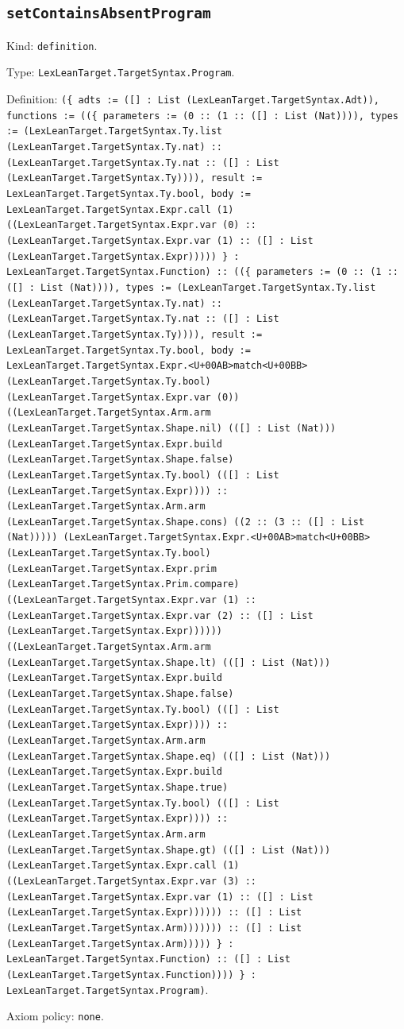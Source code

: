 \documentclass[11pt]{article}
\begin{document}
\subsection*{\texttt{setContainsAbsentProgram}}
\noindent Kind: \texttt{definition}.\par
\noindent Type: \texttt{LexLeanTarget.TargetSyntax.Program}.\par
\noindent Definition: \texttt{(\{ adts := ([] : List (LexLeanTarget.TargetSyntax.Adt)), functions := ((\{ parameters := (0 :: (1 :: ([] : List (Nat)))), types := (LexLeanTarget.TargetSyntax.Ty.list (LexLeanTarget.TargetSyntax.Ty.nat) :: (LexLeanTarget.TargetSyntax.Ty.nat :: ([] : List (LexLeanTarget.TargetSyntax.Ty)))), result := LexLeanTarget.TargetSyntax.Ty.bool, body := LexLeanTarget.TargetSyntax.Expr.call (1) ((LexLeanTarget.TargetSyntax.Expr.var (0) :: (LexLeanTarget.TargetSyntax.Expr.var (1) :: ([] : List (LexLeanTarget.TargetSyntax.Expr))))) \} : LexLeanTarget.TargetSyntax.Function) :: ((\{ parameters := (0 :: (1 :: ([] : List (Nat)))), types := (LexLeanTarget.TargetSyntax.Ty.list (LexLeanTarget.TargetSyntax.Ty.nat) :: (LexLeanTarget.TargetSyntax.Ty.nat :: ([] : List (LexLeanTarget.TargetSyntax.Ty)))), result := LexLeanTarget.TargetSyntax.Ty.bool, body := LexLeanTarget.TargetSyntax.Expr.<U+00AB>match<U+00BB> (LexLeanTarget.TargetSyntax.Ty.bool) (LexLeanTarget.TargetSyntax.Expr.var (0)) ((LexLeanTarget.TargetSyntax.Arm.arm (LexLeanTarget.TargetSyntax.Shape.nil) (([] : List (Nat))) (LexLeanTarget.TargetSyntax.Expr.build (LexLeanTarget.TargetSyntax.Shape.false) (LexLeanTarget.TargetSyntax.Ty.bool) (([] : List (LexLeanTarget.TargetSyntax.Expr)))) :: (LexLeanTarget.TargetSyntax.Arm.arm (LexLeanTarget.TargetSyntax.Shape.cons) ((2 :: (3 :: ([] : List (Nat))))) (LexLeanTarget.TargetSyntax.Expr.<U+00AB>match<U+00BB> (LexLeanTarget.TargetSyntax.Ty.bool) (LexLeanTarget.TargetSyntax.Expr.prim (LexLeanTarget.TargetSyntax.Prim.compare) ((LexLeanTarget.TargetSyntax.Expr.var (1) :: (LexLeanTarget.TargetSyntax.Expr.var (2) :: ([] : List (LexLeanTarget.TargetSyntax.Expr)))))) ((LexLeanTarget.TargetSyntax.Arm.arm (LexLeanTarget.TargetSyntax.Shape.lt) (([] : List (Nat))) (LexLeanTarget.TargetSyntax.Expr.build (LexLeanTarget.TargetSyntax.Shape.false) (LexLeanTarget.TargetSyntax.Ty.bool) (([] : List (LexLeanTarget.TargetSyntax.Expr)))) :: (LexLeanTarget.TargetSyntax.Arm.arm (LexLeanTarget.TargetSyntax.Shape.eq) (([] : List (Nat))) (LexLeanTarget.TargetSyntax.Expr.build (LexLeanTarget.TargetSyntax.Shape.true) (LexLeanTarget.TargetSyntax.Ty.bool) (([] : List (LexLeanTarget.TargetSyntax.Expr)))) :: (LexLeanTarget.TargetSyntax.Arm.arm (LexLeanTarget.TargetSyntax.Shape.gt) (([] : List (Nat))) (LexLeanTarget.TargetSyntax.Expr.call (1) ((LexLeanTarget.TargetSyntax.Expr.var (3) :: (LexLeanTarget.TargetSyntax.Expr.var (1) :: ([] : List (LexLeanTarget.TargetSyntax.Expr)))))) :: ([] : List (LexLeanTarget.TargetSyntax.Arm))))))) :: ([] : List (LexLeanTarget.TargetSyntax.Arm))))) \} : LexLeanTarget.TargetSyntax.Function) :: ([] : List (LexLeanTarget.TargetSyntax.Function)))) \} : LexLeanTarget.TargetSyntax.Program)}.\par
\noindent Axiom policy: \texttt{none}.\par
\end{document}
